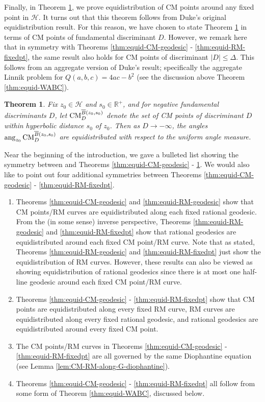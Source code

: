 \documentclass[11pt,letterpaper,reqno]{amsart}
\newtheorem{theorem}{Theorem}[section]
\numberwithin{equation}{section}
\numberwithin{figure}{section}
\numberwithin{table}{section}
\newcommand{\RR}{\mathbb{R}}
\newcommand{\HH}{\mathcal{H}}
\newcommand{\CM}{\textnormal{CM}}
\begin{document}
Finally, in Theorem \ref{thm:equid-CM-fixedpt}, we prove equidistribution of CM points around any fixed point in $\HH$. It turns out that this theorem follows from Duke's original equidistribution result. For this reason, we have chosen to state Theorem \ref{thm:equid-CM-fixedpt} in terms of CM points of fundamental discriminant $D$. However, we remark here that in symmetry with Theorems \ref{thm:equid-CM-geodesic} - \ref{thm:equid-RM-fixedpt}, the same result also holds for CM points of discriminant $|D| \le \Delta$. This follows from an aggregate version of Duke's result; specifically the aggregate Linnik problem for $Q(a,b,c)=4ac-b^2$ (see the discussion above Theorem \ref{thm:equid-WABC}).
\begin{theorem} 
    \label{thm:equid-CM-fixedpt}
    Fix $z_0 \in \HH$ and $s_0 \in \RR^+$, and for negative fundamental discriminants $D$, let 
    $\CM^{\overline B(z_0, s_0)}_{D}$ denote the set of CM points of discriminant $D$
    within hyperbolic distance $s_0$ of $z_0$.
    Then as $D \to -\infty$, the angles $\mathrm{ang}_{z_0}\, \CM^{\overline B(z_0,s_0)}_{D}$ are equidistributed with respect to the uniform angle measure.
\end{theorem}


Near the beginning  of the introduction, we gave a bulleted list showing the symmetry between \cite[Theorem 1]{duke} and Theorems \ref{thm:equid-CM-geodesic} - \ref{thm:equid-CM-fixedpt}. We would also like to point out four additional symmetries between Theorems \ref{thm:equid-CM-geodesic} - \ref{thm:equid-RM-fixedpt}.
\begin{enumerate}
    \item 
    Theorems \ref{thm:equid-CM-geodesic} and \ref{thm:equid-RM-geodesic} show that CM points/RM curves are equidistributed along each fixed rational geodesic. From the (in some sense) inverse perspective, Theorems \ref{thm:equid-RM-geodesic} and \ref{thm:equid-RM-fixedpt} show that rational geodesics are equidistributed around each fixed CM point/RM curve. Note that as stated, Theorems \ref{thm:equid-RM-geodesic} and \ref{thm:equid-RM-fixedpt} just show the equidistribution of RM curves. However, these results can also be viewed as showing equidistribution of rational geodesics since there is at most one half-line geodesic around each fixed CM point/RM curve.
    \item 
    Theorems \ref{thm:equid-CM-geodesic} - \ref{thm:equid-RM-fixedpt} show that CM points are equidistributed along every fixed RM curve, RM curves are equidistributed along every fixed rational geodesic, and rational geodesics are equidistributed around every fixed CM point.
    \item 
    The CM points/RM curves in Theorems \ref{thm:equid-CM-geodesic} - \ref{thm:equid-RM-fixedpt} are all governed by the same Diophantine equation (see Lemma \ref{lem:CM-RM-along-G-diophantine}).
    \item 
    Theorems \ref{thm:equid-CM-geodesic} - \ref{thm:equid-RM-fixedpt} all follow from some form of Theorem \ref{thm:equid-WABC}, discussed below.
\end{enumerate}
\end{document}

